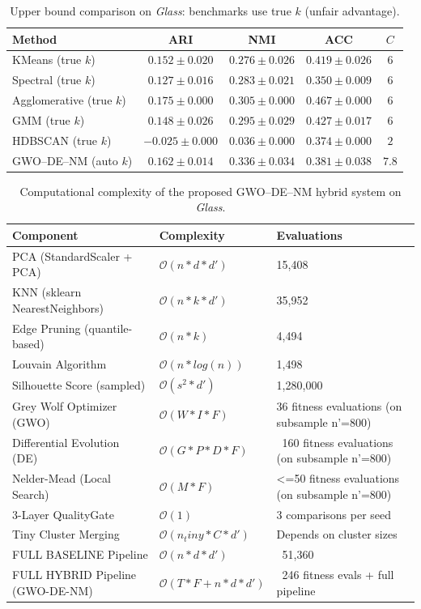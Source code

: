 \begin{table}[htbp]
\centering\small
\caption{Upper bound comparison on \textit{Glass}: benchmarks use true $k$ (unfair advantage).}
\label{tab:upper_glass}
\begin{tabular}{lcccc}
\toprule
Method & ARI & NMI & ACC & $C$ \\
\midrule
KMeans (true $k$) & $0.152 \pm 0.020$ & $0.276 \pm 0.026$ & $0.419 \pm 0.026$ & $6$ \\
Spectral (true $k$) & $0.127 \pm 0.016$ & $0.283 \pm 0.021$ & $0.350 \pm 0.009$ & $6$ \\
Agglomerative (true $k$) & $0.175 \pm 0.000$ & $0.305 \pm 0.000$ & $0.467 \pm 0.000$ & $6$ \\
GMM (true $k$) & $0.148 \pm 0.026$ & $0.295 \pm 0.029$ & $0.427 \pm 0.017$ & $6$ \\
HDBSCAN (true $k$) & $-0.025 \pm 0.000$ & $0.036 \pm 0.000$ & $0.374 \pm 0.000$ & $2$ \\
\midrule
GWO--DE--NM (auto $k$) & $\mathbf{0.162 \pm 0.014}$ & $\mathbf{0.336 \pm 0.034}$ & $\mathbf{0.381 \pm 0.038}$ & $7.8$ \\
\bottomrule
\end{tabular}
\end{table}

\begin{table}[htbp]
\centering
\small
\caption{Computational complexity of the proposed GWO--DE--NM hybrid system on \textit{Glass}.}
\label{tab:complexity_glass}
\begin{tabular}{lll}
\toprule
Component & Complexity & Evaluations \\
\midrule
PCA (StandardScaler + PCA) & $\mathcal{O}(n * d * d')$ & 15,408 \\
KNN (sklearn NearestNeighbors) & $\mathcal{O}(n * k * d')$ & 35,952 \\
Edge Pruning (quantile-based) & $\mathcal{O}(n * k)$ & 4,494 \\
Louvain Algorithm & $\mathcal{O}(n * log(n))$ & 1,498 \\
Silhouette Score (sampled) & $\mathcal{O}(s^2 * d')$ & 1,280,000 \\
Grey Wolf Optimizer (GWO) & $\mathcal{O}(W * I * F)$ & 36 fitness evaluations (on subsample n'=800) \\
Differential Evolution (DE) & $\mathcal{O}(G * P * D * F)$ & ~160 fitness evaluations (on subsample n'=800) \\
Nelder-Mead (Local Search) & $\mathcal{O}(M * F)$ & <=50 fitness evaluations (on subsample n'=800) \\
3-Layer QualityGate & $\mathcal{O}(1)$ & 3 comparisons per seed \\
Tiny Cluster Merging & $\mathcal{O}(n_tiny * C * d')$ & Depends on cluster sizes \\
\midrule
FULL BASELINE Pipeline & $\mathcal{O}(n * d * d')$ & ~51,360 \\
\midrule
FULL HYBRID Pipeline (GWO-DE-NM) & $\mathcal{O}(T * F + n * d * d')$ & ~246 fitness evals + full pipeline \\
\bottomrule
\end{tabular}
\end{table}
